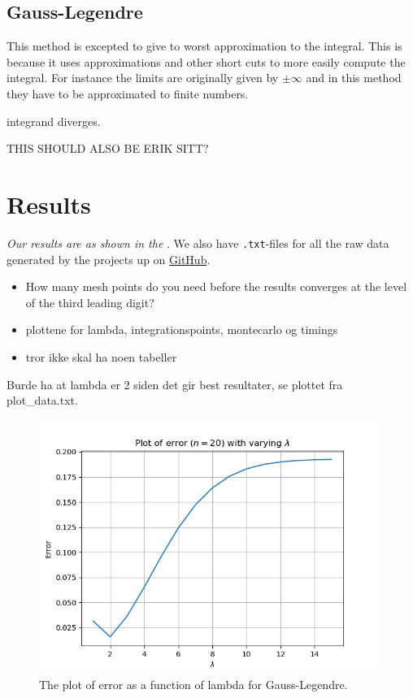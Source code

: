 \documentclass{article}
\begin{document}
\subsection{Gauss-Legendre}

This method is excepted to give to worst approximation to the integral. This is because it uses approximations and other short cuts to more easily compute the integral. For instance the limits are originally given by $\pm \infty$ and in this method they have to be approximated to finite numbers.

integrand diverges.

THIS SHOULD ALSO BE ERIK SITT?

\vspace{1cm}

\section{Results} \label{sec:Results}

  \textit{Our results are as shown in the }. We also have \texttt{.txt}-files for all the raw data generated by the projects up on \href{https://github.com/Erikbgram/Fys3150}{GitHub}. \\

\begin{itemize}

  \item How many mesh points do you need before the results converges at the level of the third leading digit?

  \item plottene for lambda, integrationspoints, montecarlo og timings

  \item tror ikke skal ha noen tabeller

\end{itemize}

  Burde ha at lambda er 2 siden det gir best resultater, se plottet fra plot\_data.txt.


  \begin{figure}[ht]
  	\centering
    \includegraphics[width = 11cm]{images/error-lambda.png}
  	\caption{The plot of error as a function of lambda for Gauss-Legendre. }
    \label{fig:lambdapng}
  \end{figure}
\end{document}
